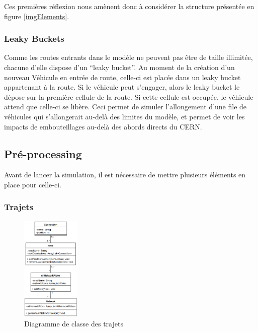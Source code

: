 \documentclass[a4paper,11pt, titlepage]{extarticle}
\begin{document}
Ces premières réflexion nous amènent donc à considérer la structure présentée en figure \ref{imgElements}.

\newpage



\subsubsection{Leaky Buckets}

Comme les routes entrants dans le modèle ne peuvent pas être de taille illimitée, chacune d'elle dispose d'un ``leaky bucket''. Au moment de la création d'un nouveau Véhicule en entrée de route, celle-ci est placée dans un leaky bucket appartenant à la route. Si le véhicule peut s'engager, alors le leaky bucket le dépose sur la première cellule de la route. Si cette cellule est occupée, le véhicule attend que celle-ci se libère. Ceci permet de simuler l'allongement d'une file de véhicules qui s'allongerait au-delà des limites du modèle, et permet de voir les impacts de embouteillages au-delà des abords directs du CERN.

\subsection{Pré-processing}

Avant de lancer la simulation, il est nécessaire de mettre plusieurs éléments en place pour celle-ci.

\subsubsection{Trajets}

\begin{figure}
  \begin{center}
    \includegraphics[width=0.25\textwidth]{rides_diagram.png}
  \end{center}
  \caption{Diagramme de classe des trajets}
  \label{imgRides}
\end{figure}
\end{document}
